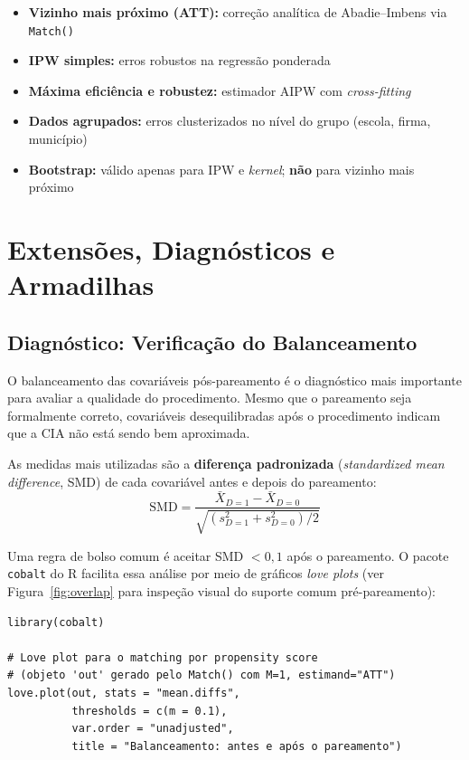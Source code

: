 \documentclass[12pt,a4paper]{article}
\begin{document}
\begin{notabox}
\begin{itemize}[leftmargin=1.2em, itemsep=2pt]
  \item \textbf{Vizinho mais próximo (ATT):} correção analítica de Abadie--Imbens via \texttt{Match()}
  \item \textbf{IPW simples:} erros robustos na regressão ponderada
  \item \textbf{Máxima eficiência e robustez:} estimador AIPW com \textit{cross-fitting}
  \item \textbf{Dados agrupados:} erros clusterizados no nível do grupo (escola, firma, município)
  \item \textbf{Bootstrap:} válido apenas para IPW e \textit{kernel}; \textbf{não} para vizinho mais próximo
\end{itemize}
\end{notabox}

\newpage
\section{Extensões, Diagnósticos e Armadilhas}\label{sec:diagnosticos}

\subsection{Diagnóstico: Verificação do Balanceamento}

O balanceamento das covariáveis pós-pareamento é o diagnóstico mais importante para avaliar a qualidade do procedimento. Mesmo que o pareamento seja formalmente correto, covariáveis desequilibradas após o procedimento indicam que a CIA não está sendo bem aproximada.

As medidas mais utilizadas são a \textbf{diferença padronizada} (\textit{standardized mean difference}, SMD) de cada covariável antes e depois do pareamento:
$$\text{SMD} = \frac{\bar{X}_{D=1} - \bar{X}_{D=0}}{\sqrt{(s_{D=1}^2 + s_{D=0}^2)/2}}$$

Uma regra de bolso comum é aceitar SMD $< 0{,}1$ após o pareamento. O pacote \texttt{cobalt} do R facilita essa análise por meio de gráficos \textit{love plots} (ver Figura~\ref{fig:overlap} para inspeção visual do suporte comum pré-pareamento):

\begin{lstlisting}[style=Rstyle]
library(cobalt)

# Love plot para o matching por propensity score
# (objeto 'out' gerado pelo Match() com M=1, estimand="ATT")
love.plot(out, stats = "mean.diffs",
          thresholds = c(m = 0.1),
          var.order = "unadjusted",
          title = "Balanceamento: antes e após o pareamento")
\end{lstlisting}
\end{document}
